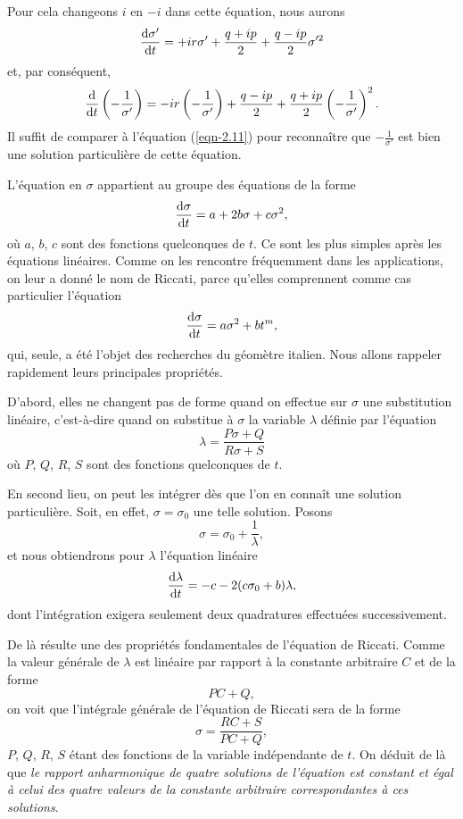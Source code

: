 Pour cela changeons $i$ en $-i$ dans cette équation, nous aurons
\[
	\frac{\operatorname{d}\!{\sigma'}}{\operatorname{d}\!{t}} = + ir\sigma' + \frac{q+ ip}{2} + \frac{q - ip}{2}\sigma'^2
\]
et, par conséquent,
\[
	\frac{\operatorname{d}\!{}}{\operatorname{d}\!{t}}\left(-\frac{1}{\sigma'}\right) = -ir\left(-\frac{1}{\sigma'}\right) + \frac{q - ip}{2} + \frac{q 
	+ ip}{2}\left(-\frac{1}{\sigma'}\right)^2.
\]
Il suffit de comparer à l'équation (\ref{eqn-2.11}) pour reconnaître que $-\frac{1}{\sigma'}$ est bien une solution 
particulière de cette équation.

 L'équation en $\sigma$ appartient au groupe des équations de la forme
\begin{equation}
	\frac{\operatorname{d}\!{\sigma}}{\operatorname{d}\!{t}} = a + 2b\sigma + c\sigma^2,
	\label{eqn-2.13}
\end{equation}
où $a$, $b$, $c$ sont des fonctions quelconques de $t$. Ce sont les plus simples après les équations linéaires. Comme 
on les rencontre fréquemment dans les applications, on leur a donné le nom de Riccati, parce qu'elles comprennent comme 
cas particulier l'équation
\[
	\frac{\operatorname{d}\!{\sigma}}{\operatorname{d}\!{t}} = a\sigma^2 + bt^m,
\]
qui, seule, a été l'objet des recherches du géomètre italien. Nous allons rappeler rapidement leurs principales 
propriétés.

D'abord, elles ne changent pas de forme quand on effectue sur $\sigma$ une substitution linéaire, c'est-à-dire quand on 
substitue à $\sigma$ la variable $\lambda$ définie par l'équation
\[
	\lambda = \frac{P\sigma + Q}{R\sigma + S}
\]
où $P$, $Q$, $R$, $S$ sont des fonctions quelconques de $t$.

En second lieu, on peut les intégrer dès que l'on en connaît une solution particulière. Soit, en effet, 
$\sigma=\sigma_0$ une telle solution. Posons
\[
	\sigma = \sigma_0 + \frac{1}{\lambda},
\]
et nous obtiendrons pour $\lambda$ l'équation linéaire
\begin{equation}
	\frac{\operatorname{d}\!{\lambda}}{\operatorname{d}\!{t}} = -c -2(c\sigma_0 + b)\lambda,
	\label{eqn-2.14}
\end{equation}
dont l'intégration exigera seulement deux quadratures effectuées successivement.

De là résulte une des propriétés fondamentales de l'équation de Riccati. Comme la valeur générale de $\lambda$ est 
linéaire par rapport à la constante arbitraire $C$ et de la forme
\[
	PC + Q,
\]
on voit que l'intégrale générale de l'équation de Riccati sera de la forme
\[
	\sigma = \frac{RC + S}{PC + Q},
\]
$P$, $Q$, $R$, $S$ étant des fonctions de la variable indépendante de $t$. On déduit de là que \textit{le rapport 
anharmonique de quatre solutions de l'équation est constant et égal à celui des quatre valeurs de la constante 
arbitraire correspondantes à ces solutions}.
